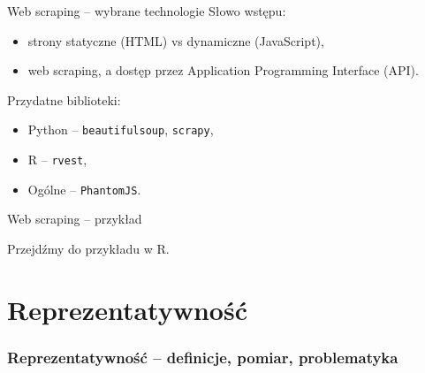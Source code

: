 \documentclass[10pt,ignorenonframetext, aspectratio=169]{beamer}
\begin{document}
\begin{frame}{Web scraping -- wybrane technologie}
Słowo wstępu:
\begin{itemize}
    \item strony statyczne (HTML) vs dynamiczne (JavaScript),
    \item web scraping, a dostęp przez Application Programming Interface (API).
\end{itemize}

Przydatne biblioteki:
    \begin{itemize}
        \item Python -- \texttt{beautifulsoup}, \texttt{scrapy},
        \item R -- \texttt{rvest},
        \item Ogólne -- \texttt{PhantomJS}.
    \end{itemize}
\end{frame}

\begin{frame}{Web scraping -- przykład}
    \begin{center}
        Przejdźmy do przykładu w R.
    \end{center}
\end{frame}

\section{Reprezentatywność}

\subsubsection{Reprezentatywność -- definicje, pomiar, problematyka}




    
    
\end{document}
